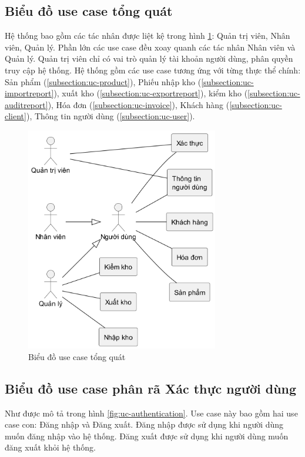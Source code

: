 \documentclass[../DoAn.tex]{subfiles}
\begin{document}
\subsection{Biểu đồ use case tổng quát}
\label{subsection:uc-general}
Hệ thống bao gồm các tác nhân được liệt kệ trong hình \ref{fig:uc-general}: Quản trị viên, Nhân viên, Quản lý. Phần lớn các use case đều xoay quanh các tác nhân Nhân viên và Quản lý. Quản trị viên chỉ có vai trò quản lý tài khoản người dùng, phân quyền truy cập hệ thống. Hệ thống gồm các use case tương ứng với từng thực thể chính: Sản phẩm (\ref{subsection:uc-product}), Phiếu nhập kho (\ref{subsection:uc-importreport}), xuất kho (\ref{subsection:uc-exportreport}), kiểm kho (\ref{subsection:uc-auditreport}), Hóa đơn (\ref{subsection:uc-invoice}), Khách hàng (\ref{subsection:uc-client}), Thông tin người dùng (\ref{subsection:uc-user}).

\begin{figure}[H]
    \centering
    \includegraphics[width=0.75\textwidth]{Hinhve/usecases/General}
    \caption{Biểu đồ use case tổng quát}
    \label{fig:uc-general}
\end{figure}
\break


\subsection{Biểu đồ use case phân rã Xác thực người dùng}
\label{subsection:uc-authentication}
Như được mô tả trong hình \ref{fig:uc-authentication}. Use case này bao gồm hai use case con: Đăng nhập và Đăng xuất. Đăng nhập được sử dụng khi người dùng muốn đăng nhập vào hệ thống. Đăng xuất được sử dụng khi người dùng muốn đăng xuất khỏi hệ thống.
\end{document}
